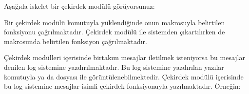 \documentclass[a4paper,10pt,turkish]{sphinxmanual}
\begin{document}
\sphinxAtStartPar
Aşağıda iskelet bir çekirdek modülü görüyorsunuz:

\begin{sphinxVerbatim}[commandchars=\\\{\}]






\end{sphinxVerbatim}

\sphinxAtStartPar
Bir çekirdek modülü  komutuyla yüklendiğinde onun  makrosuyla belirtilen fonksiyonu
çağrılmaktadır. Çekirdek modülü  ile sistemden çıkartılırken de  makrosunda
belirtilen fonksiyon çağrılmaktadır.

\sphinxAtStartPar
Çekirdek modülleri içerisinde birtakım mesajlar iletilmek isteniyorsa bu mesajlar 
denilen log sistemine yazdırılmaktadır. Bu log sistemine yazdırılan yazılar  komutuyla ya da
 dosyası ile görüntülenebilmektedir. Çekirdek modülü içerisinde bu log sistemine
mesajlar  isimli çekirdek fonksiyonuyla yazılmaktadır. Örneğin:
\end{document}
